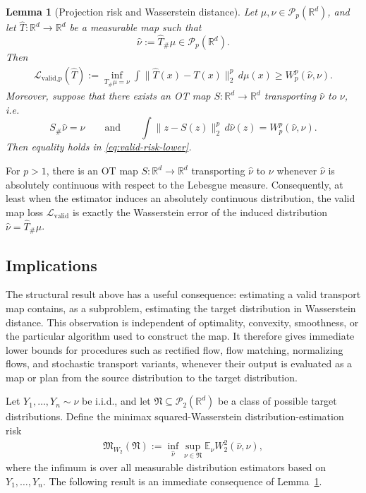 \documentclass[11pt,twoside]{article}
\newcommand{\lvalid}{\mathcal{L}_{\text{valid}}}
\newcommand{\lvalidp}{\mathcal{L}_{\text{valid,p}}}
\newtheorem{lemma}{Lemma}
\newcommand{\targetclass}{\mathfrak{N}}
\newcommand{\wtwominimaxrisk}{\mathfrak M_{W_2}}
\begin{document}
\begin{lemma}[Projection risk and Wasserstein distance]
\label{lem:main}
Let $\mu,\nu \in \mathcal{P}_p(\mathbb{R}^d)$, and let $\widehat{T}:\mathbb{R}^d \to \mathbb{R}^d$ be a measurable map such that
\[
\widehat{\nu}:=\widehat{T}_{\#}\mu \in \mathcal{P}_p(\mathbb{R}^d).
\]
Then
\begin{align}
\label{eq:valid-risk-lower}
\lvalidp(\widehat{T}) := \inf_{T_{\#}\mu=\nu}
\int \|\widehat{T}(x)-T(x)\|_2^p\,d\mu(x)
\geq
W_p^p(\widehat{\nu},\nu).
\end{align}
Moreover, suppose that there exists an OT map $S:\mathbb{R}^d \to \mathbb{R}^d$ transporting $\widehat{\nu}$ to $\nu$, i.e.
\[
S_{\#}\widehat{\nu}=\nu
\qquad\text{and}\qquad
\int \|z-S(z)\|_2^p\,d\widehat{\nu}(z)
=
W_p^p(\widehat{\nu},\nu).
\]
Then equality holds in \eqref{eq:valid-risk-lower}. 
\end{lemma}
\noindent For $p>1$, there is an OT map $S:\mathbb{R}^d \to \mathbb{R}^d$ transporting $\widehat{\nu}$ to $\nu$ whenever $\widehat{\nu}$ is absolutely continuous with respect to the Lebesgue measure. 
\noindent Consequently, at least when the estimator induces an absolutely continuous distribution, the valid map loss $\lvalid$ is exactly the Wasserstein error of the induced distribution $\widehat{\nu}=\widehat{T}_{\#}\mu$. 

\subsection{Implications}
\label{sec:implications}
The structural result above has a useful consequence: estimating a valid transport map contains, as a subproblem, estimating the target distribution in Wasserstein distance. This observation is independent of optimality, convexity, smoothness, or the particular algorithm used to construct the map. It therefore gives immediate lower bounds for procedures such as rectified flow, flow matching, normalizing flows, and stochastic transport variants, whenever their output is evaluated as a map or plan from the source distribution to the target distribution.

Let $Y_1,\ldots,Y_n\sim \nu$ be i.i.d., and let $\targetclass\subseteq \mathcal P_2(\mathbb R^d)$ be a class of possible target distributions. Define the minimax squared-Wasserstein distribution-estimation risk
\begin{align*}
\wtwominimaxrisk(\targetclass):=
\inf_{\widehat\nu}
\sup_{\nu\in\targetclass}
\mathbb E_\nu W_2^2(\widehat\nu,\nu),
\end{align*}
where the infimum is over all measurable distribution estimators based on $Y_1,\ldots,Y_n$. The following result is an immediate consequence of Lemma~\ref{lem:main}.
\end{document}
